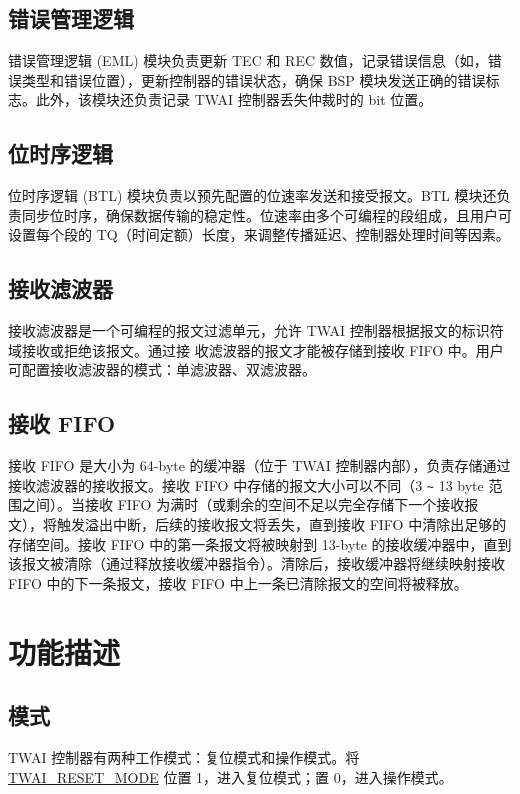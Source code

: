 \documentclass[main\_\_CN.tex]{subfiles}
\begin{document}
\subsection{错误管理逻辑}
错误管理逻辑 (EML) 模块负责更新 TEC 和 REC 数值，记录错误信息（如，错误类型和错误位置），更新控制器的错误状态，确保 BSP 模块发送正确的错误标志。此外，该模块还负责记录 TWAI 控制器丢失仲裁时的 bit 位置。

\subsection{位时序逻辑}
位时序逻辑 (BTL) 模块负责以预先配置的位速率发送和接受报文。BTL 模块还负责同步位时序，确保数据传输的稳定性。位速率由多个可编程的段组成，且用户可设置每个段的 TQ（时间定额）长度，来调整传播延迟、控制器处理时间等因素。

\subsection{接收滤波器}
接收滤波器是一个可编程的报文过滤单元，允许 TWAI 控制器根据报文的标识符域接收或拒绝该报文。通过接
收滤波器的报文才能被存储到接收 FIFO 中。用户可配置接收滤波器的模式：单滤波器、双滤波器。

\subsection{接收 FIFO}
接收 FIFO 是大小为 64-byte 的缓冲器（位于 TWAI 控制器内部），负责存储通过接收滤波器的接收报文。接收 FIFO 中存储的报文大小可以不同（3 \verb+~+ 13 byte 范围之间）。当接收 FIFO 为满时（或剩余的空间不足以完全存储下一个接收报文），将触发溢出中断，后续的接收报文将丢失，直到接收 FIFO 中清除出足够的存储空间。接收 FIFO 中的第一条报文将被映射到 13-byte 的接收缓冲器中，直到该报文被清除（通过释放接收缓冲器指令）。清除后，接收缓冲器将继续映射接收 FIFO 中的下一条报文，接收 FIFO 中上一条已清除报文的空间将被释放。

\section{功能描述}

\subsection{模式}
\label{sec:twai-modes}
\chipname{} TWAI 控制器有两种工作模式：复位模式和操作模式。将 \hyperref[fielddesc:TWAIRESETMODE]{TWAI\_RESET\_MODE} 位置 1，进入复位模式；置 0，进入操作模式。
\end{document}
